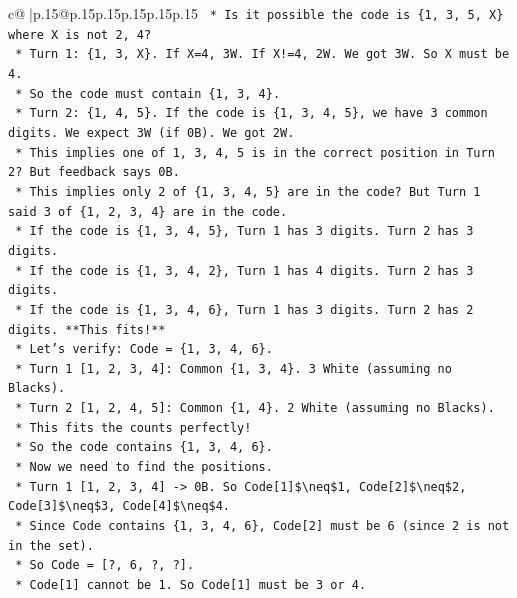 \documentclass{article}
\begin{document}
{\begin{supertabular}{c@{$\;$}|p{.15\linewidth}@{}p{.15\linewidth}p{.15\linewidth}p{.15\linewidth}p{.15\linewidth}p{.15\linewidth}}
{{{\texttt{        *   Is it possible the code is \{1, 3, 5, X\} where X is not 2, 4?} \\
\texttt{            *   Turn 1: \{1, 3, X\}. If X=4, 3W. If X!=4, 2W. We got 3W. So X must be 4.} \\
\texttt{            *   So the code must contain \{1, 3, 4\}.} \\
\texttt{            *   Turn 2: \{1, 4, 5\}. If the code is \{1, 3, 4, 5\}, we have 3 common digits. We expect 3W (if 0B). We got 2W.} \\
\texttt{            *   This implies one of 1, 3, 4, 5 is in the correct position in Turn 2? But feedback says 0B.} \\
\texttt{            *   This implies only 2 of \{1, 3, 4, 5\} are in the code? But Turn 1 said 3 of \{1, 2, 3, 4\} are in the code.} \\
\texttt{            *   If the code is \{1, 3, 4, 5\}, Turn 1 has 3 digits. Turn 2 has 3 digits.} \\
\texttt{            *   If the code is \{1, 3, 4, 2\}, Turn 1 has 4 digits. Turn 2 has 3 digits.} \\
\texttt{            *   If the code is \{1, 3, 4, 6\}, Turn 1 has 3 digits. Turn 2 has 2 digits. **This fits!**} \\
\texttt{            *   Let's verify: Code = \{1, 3, 4, 6\}.} \\
\texttt{                *   Turn 1 {[}1, 2, 3, 4{]}: Common \{1, 3, 4\}. 3 White (assuming no Blacks).} \\
\texttt{                *   Turn 2 {[}1, 2, 4, 5{]}: Common \{1, 4\}. 2 White (assuming no Blacks).} \\
\texttt{            *   This fits the counts perfectly!} \\
\texttt{            *   So the code contains \{1, 3, 4, 6\}.} \\
\texttt{            *   Now we need to find the positions.} \\
\texttt{            *   Turn 1 {[}1, 2, 3, 4{]} {-}> 0B. So Code{[}1{]}\$\textbackslash{}neq\$1, Code{[}2{]}\$\textbackslash{}neq\$2, Code{[}3{]}\$\textbackslash{}neq\$3, Code{[}4{]}\$\textbackslash{}neq\$4.} \\
\texttt{                *   Since Code contains \{1, 3, 4, 6\}, Code{[}2{]} must be 6 (since 2 is not in the set).} \\
\texttt{                *   So Code = {[}?, 6, ?, ?{]}.} \\
\texttt{                *   Code{[}1{]} cannot be 1. So Code{[}1{]} must be 3 or 4.} \\
}}}
\end{supertabular}}
\end{document}
